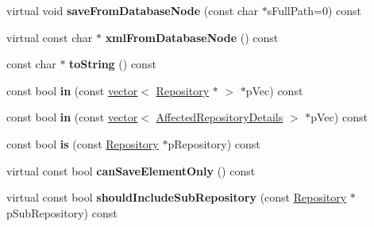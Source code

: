 \begin{DoxyCompactItemize}
\item 
\hypertarget{classgeneral__server_1_1Repository_aa7395ca86f67376561b5ba7171bcc3ba}{virtual void {\bfseries save\-From\-Database\-Node} (const char $\ast$s\-Full\-Path=0) const }\label{classgeneral__server_1_1Repository_aa7395ca86f67376561b5ba7171bcc3ba}

\item 
\hypertarget{classgeneral__server_1_1Repository_a9058ccb6d332c0aa5dfd5ea434b55c67}{virtual const char $\ast$ {\bfseries xml\-From\-Database\-Node} () const }\label{classgeneral__server_1_1Repository_a9058ccb6d332c0aa5dfd5ea434b55c67}

\item 
\hypertarget{classgeneral__server_1_1Repository_a5cf16c36874fc42e9ff33c801020d083}{const char $\ast$ {\bfseries to\-String} () const }\label{classgeneral__server_1_1Repository_a5cf16c36874fc42e9ff33c801020d083}

\item 
\hypertarget{classgeneral__server_1_1Repository_a147c9f1796bb4485f0c27abef5a6be64}{const bool {\bfseries in} (const \hyperlink{classvector}{vector}$<$ \hyperlink{classgeneral__server_1_1Repository}{\-Repository} $\ast$ $>$ $\ast$p\-Vec) const }\label{classgeneral__server_1_1Repository_a147c9f1796bb4485f0c27abef5a6be64}

\item 
\hypertarget{classgeneral__server_1_1Repository_ae6fcc9e499bceccdcc70bd4bce322cfa}{const bool {\bfseries in} (const \hyperlink{classvector}{vector}$<$ \hyperlink{structgeneral__server_1_1Repository_1_1AffectedRepositoryDetails}{\-Affected\-Repository\-Details} $>$ $\ast$p\-Vec) const }\label{classgeneral__server_1_1Repository_ae6fcc9e499bceccdcc70bd4bce322cfa}

\item 
\hypertarget{classgeneral__server_1_1Repository_ad83791e158fb5aca43ed5a6eb733167d}{const bool {\bfseries is} (const \hyperlink{classgeneral__server_1_1Repository}{\-Repository} $\ast$p\-Repository) const }\label{classgeneral__server_1_1Repository_ad83791e158fb5aca43ed5a6eb733167d}

\item 
\hypertarget{classgeneral__server_1_1Repository_a6971bc7973714b9539293b5062c7681c}{virtual const bool {\bfseries can\-Save\-Element\-Only} () const }\label{classgeneral__server_1_1Repository_a6971bc7973714b9539293b5062c7681c}

\item 
\hypertarget{classgeneral__server_1_1Repository_aaba65a14fbdedcd3a283b33b77488e2f}{virtual const bool {\bfseries should\-Include\-Sub\-Repository} (const \hyperlink{classgeneral__server_1_1Repository}{\-Repository} $\ast$p\-Sub\-Repository) const }\label{classgeneral__server_1_1Repository_aaba65a14fbdedcd3a283b33b77488e2f}


\end{DoxyCompactItemize}
